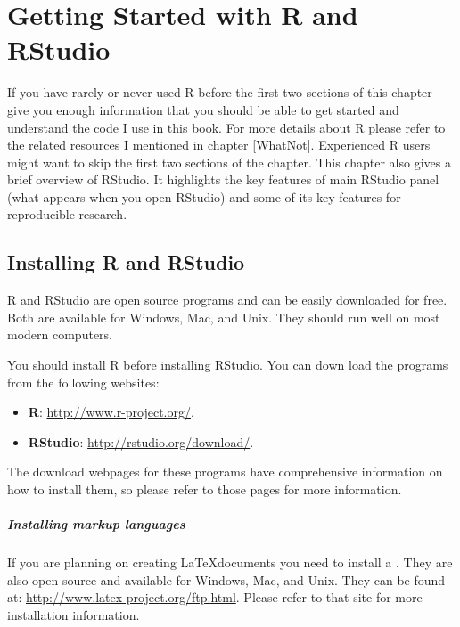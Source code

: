 \documentclass[ChapterTOCs,krantz1]{krantz}
\begin{document}




\chapter{Getting Started with R and RStudio}

If you have rarely or never used R before the first two sections of this chapter give you enough information that you should be able to get started and understand the code I use in this book. For more details about R please refer to the related resources I mentioned in chapter \ref{WhatNot}. Experienced R users might want to skip the first two sections of the chapter. This chapter also gives a brief overview of RStudio. It highlights the key features of main RStudio panel (what appears when you open RStudio) and some of its key features for reproducible research.

\section{Installing R and RStudio}

R and RStudio are open source programs and can be easily downloaded for free. Both are available for Windows, Mac, and Unix. They should run well on most modern computers. 

You should install R before installing RStudio. You can down load the programs from the following websites:

\begin{itemize}
    \item {\bf{R}}: \url{http://www.r-project.org/},
    \item {\bf{RStudio}}: \url{http://rstudio.org/download/}.
\end{itemize}

\noindent The download webpages for these programs have comprehensive information on how to install them, so please refer to those pages for more information.

\paragraph{Installing markup languages}

If you are planning on creating \LaTeX documents you need to install a . They are also open source and available for Windows, Mac, and Unix. They can be found at: \url{http://www.latex-project.org/ftp.html}. Please refer to that site for more installation information.
\end{document}
